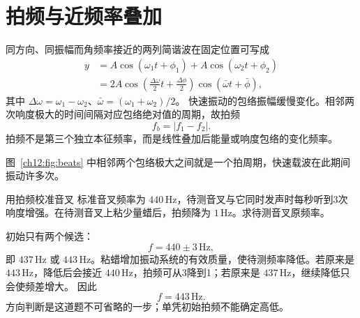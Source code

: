 \section{拍频与近频率叠加}

同方向、同振幅而角频率接近的两列简谐波在固定位置可写成
\begin{align}
 y&=A\cos(\omega_1t+\phi_1)+A\cos(\omega_2t+\phi_2)\\
 &=2A\cos\!\left(\frac{\Delta\omega}{2}t+\frac{\Delta\phi}{2}\right)
 \cos\!\left(\bar\omega t+\bar\phi\right),
\end{align}
其中 $\Delta\omega=\omega_1-\omega_2$、$\bar\omega=(\omega_1+\omega_2)/2$。
快速振动的包络振幅缓慢变化。相邻两次响度极大的时间间隔对应包络绝对值的周期，故拍频
\begin{equation}
 f_b=|f_1-f_2|.
\end{equation}
拍频不是第三个独立本征频率，而是线性叠加后能量或响度包络的变化频率。

\begin{center}
\label{ch12:fig:beats}
\end{center}
图~\ref{ch12:fig:beats} 中相邻两个包络极大之间就是一个拍周期，快速载波在此期间振动许多次。

\begin{origexamplebox}{用拍频校准音叉}
\label{ch12:ex:03}
标准音叉频率为 $440\,\mathrm{Hz}$，待测音叉与它同时发声时每秒听到3次响度增强。在待测音叉上粘少量蜡后，拍频降为 $1\,\mathrm{Hz}$。求待测音叉原频率。
\end{origexamplebox}
\begin{xesolution}
初始只有两个候选：
\[
 f=440\pm3\,\mathrm{Hz},
\]
即 $437\,\mathrm{Hz}$ 或 $443\,\mathrm{Hz}$。粘蜡增加振动系统的有效质量，使待测频率降低。若原来是
$443\,\mathrm{Hz}$，降低后会接近 $440\,\mathrm{Hz}$，拍频可从3降到1；若原来是 $437\,\mathrm{Hz}$，继续降低只会使频差增大。
因此
\[
 \boxed{f=443\,\mathrm{Hz}}.
\]
方向判断是这道题不可省略的一步；单凭初始拍频不能确定高低。
\end{xesolution}

